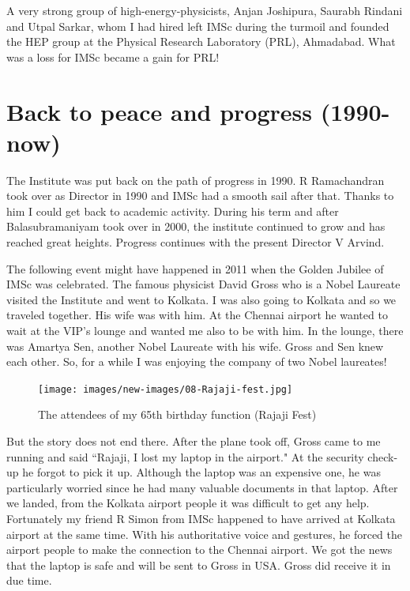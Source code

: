 A very strong group of high-energy-physicists, Anjan Joshi\-pura, Saurabh 
Rindani and Utpal Sarkar, whom I had hired left IMSc during the turmoil 
and founded the HEP group at the Physi\-cal Research Laboratory 
(PRL), Ahmadabad. What was a loss for IMSc became a gain for PRL!

\vspace{-.3cm}

\section*{Back to peace and progress (1990-now)}

\vspace{-.2cm}

The Institute was put back on the path of progress in 1990. R 
Ramachandran took over as Director in 1990 and IMSc had a smooth sail 
after that. Thanks to him I could get back to academic activity. During 
his term and after Balasubramaniyam took over in 2000, the institute 
continued to grow and has rea\-ched great heights. Progress continues with 
the present Director V Arvind.

The following event might have happened in 2011 when the Golden Jubilee 
of IMSc was celebrated. The famous physicist David Gross who is a Nobel 
Laureate visited the Institute and went to Kolkata. I was also going to 
Kolkata and so we trave\-led together. His wife was with him. At the 
Chennai airport he wanted to wait at the VIP's lounge and wanted me also 
to be with him. In the lounge, there was Amartya Sen, another Nobel 
Laureate with his wife. Gross and Sen knew each other. So, for a while I 
was enjoying the company of two Nobel laureates!

\begin{figure}[H]
\centering
\texttt{[image: images/new-images/08-Rajaji-fest.jpg]}
\caption{\small{The attendees of my 65th birthday function (Rajaji Fest)}}
\end{figure}

But the story does not end there. After the plane took off, Gross came 
to me running and said ``Rajaji, I lost my laptop in the airport." At the 
security check-up he forgot to pick it up. Although the laptop was an 
expensive one, he was particularly worried since he had many valuable 
documents in that laptop. After we landed, from the Kolkata airport 
people it was difficult to get any help. Fortunately my friend R Simon 
from IMSc ha\-ppened to have arrived at Kolkata airport at the same time. 
With his authoritative voice and gestures, he forced the airport people 
to make the connection to the Chennai airport. We got the news that the 
laptop is safe and will be sent to Gross in USA. Gross did receive it in 
due time.
\newpage


